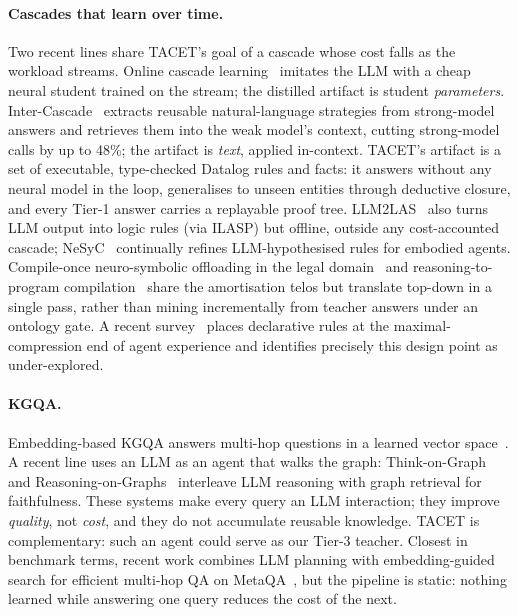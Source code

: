 \documentclass[11pt]{article}
\theoremstyle{plain}
\begin{document}
\paragraph{Cascades that learn over time.} Two recent lines share TACET's
goal of a cascade whose cost falls as the workload streams. Online cascade
learning~\citep{onlinecascade2024} imitates the LLM with a cheap neural
student trained on the stream; the distilled artifact is student
\emph{parameters}. Inter-Cascade~\citep{intercascade2025} extracts reusable
natural-language strategies from strong-model answers and retrieves them
into the weak model's context, cutting strong-model calls by up to 48\%;
the artifact is \emph{text}, applied in-context. TACET's artifact is a set
of executable, type-checked Datalog rules and facts: it answers without any
neural model in the loop, generalises to unseen entities through deductive
closure, and every Tier-1 answer carries a replayable proof tree.
LLM2LAS~\citep{llm2las2025} also turns LLM output into logic rules (via
ILASP) but offline, outside any cost-accounted cascade;
NeSyC~\citep{nesyc2025} continually refines LLM-hypothesised rules for
embodied agents. Compile-once neuro-symbolic offloading in the legal
domain~\citep{legaloffload2026} and reasoning-to-program
compilation~\citep{reacomp2026} share the amortisation telos but translate
top-down in a single pass, rather than mining incrementally from teacher
answers under an ontology gate. A recent survey~\citep{expcompression2026}
places declarative rules at the maximal-compression end of agent experience
and identifies precisely this design point as under-explored.

\paragraph{KGQA.} Embedding-based KGQA answers multi-hop questions in a
learned vector space~\citep{saxena2020embedkgqa}. A recent line uses an LLM
as an agent that walks the graph: Think-on-Graph~\citep{sun2024tog} and
Reasoning-on-Graphs~\citep{luo2024rog} interleave LLM reasoning with graph
retrieval for faithfulness. These systems make every query an LLM
interaction; they improve \emph{quality}, not \emph{cost}, and they do not
accumulate reusable knowledge. TACET is complementary: such an agent could
serve as our Tier-3 teacher. Closest in benchmark terms, recent work
combines LLM planning with embedding-guided search for efficient multi-hop
QA on MetaQA~\citep{effmultihop2025}, but the pipeline is static: nothing
learned while answering one query reduces the cost of the next.
\end{document}
